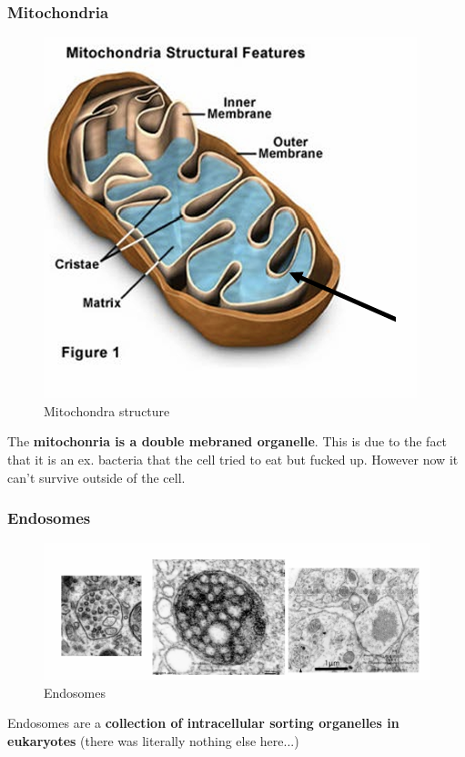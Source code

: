 \documentclass[../main.tex]{subfiles}
\begin{document}
\subsubsection{Mitochondria}
\begin{figure}[H]
    \centering
    \includegraphics[width=0.5\linewidth]{mitochondria.png}
    \caption{Mitochondra structure}
    \label{fig:enter-label}
\end{figure}
The \textbf{mitochonria is a double mebraned organelle}. This is due to the fact that it is an ex. bacteria that the cell tried to eat but fucked up. However now it can't survive outside of the cell. 

\subsubsection{Endosomes}
\begin{figure}[H]
    \centering
    \includegraphics[width=0.5\linewidth]{endosomes.png}
    \caption{Endosomes}
    \label{fig:enter-label}
\end{figure}
Endosomes are a \textbf{collection of intracellular sorting organelles in eukaryotes} (there was literally nothing else here...)
\end{document}

